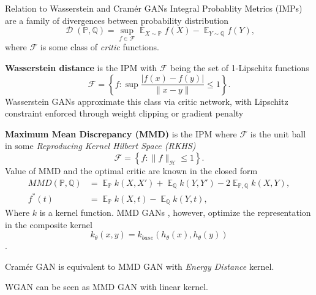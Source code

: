 \documentclass[xcolor={table}]{beamer}
\DeclareMathOperator{\D}{\mathcal{D}}
\DeclareMathOperator*{\E}{\mathbb{E}}
\newcommand{\F}{\mathcal{F}}
\newcommand{\h}{\mathcal{H}}
\newcommand{\PP}{\mathbb P}
\newcommand{\QQ}{\mathbb Q}
\begin{document}
\begin{frame}{}
\begin{columns}[T, totalwidth=\textwidth]
\begin{column}{.32\textwidth}
    \begin{block}{Relation to Wasserstein and Cram\'er GANs} 
      Integral Probablity Metrics (IMPs) are a family of divergences between 
      probability distribution
      \begin{equation}
        \D(\PP, \QQ) = \sup_{f\in\F} \E_{X\sim\PP}f(X) - \E_{Y\sim\QQ}f(Y),
      \end{equation}
      where $\F$ is some class of \emph{critic} functions. 
      \begin{itemize}
        \item{\textbf{Wasserstein distance} is the IPM with $\F$ being the set of 1-Lipschitz functions
          \[  
            \F = \left\{f: \sup\frac{|f(x) - f(y)|}{\|x - y\|}\leq 1\right\}. 
          \]
          Wasserstein GANs approximate this class via critic network, with Lipschitz 
          constraint enforced through weight clipping \citep{wgan} or gradient 
          penalty \citep{wgan-gp}
        \item \textbf{Maximum Mean Discrepancy (MMD)} \citep{mmd-jmlr} is the IPM 
          where $\F$ is the unit ball in some 
          \emph{Reproducing Kernel Hilbert Space (RKHS)}
          \[ \F = \left\{f: \|f\|_{\h} \leq 1\right\}. \]
          Value of MMD and the optimal critic are known in the closed form
          \begin{align*}
            MMD(\PP, \QQ) &= \E_{\PP} k(X,X') + \E_{\QQ} k(Y,Y') - 2\E_{\PP,\QQ} k(X,Y),\\
            f^*(t) &= \E_{\PP}k(X, t) - \E_{\QQ}k(Y, t),
          \end{align*}
          Where $k$ is a kernel function. MMD GANs \citep{mmd-gan}, however, 
          optimize the representation in the composite kernel 
          \[ k_{\theta}(x, y) = k_{base}(h_{\theta}(x), h_{\theta}(y)) \].
        }
        \item Cram\'er GAN is equivalent to MMD GAN with \emph{Energy Distance} kernel.
        \item WGAN can be seen as  MMD GAN with linear kernel.
      \end{itemize}
    \end{block}
  \end{column}


\end{columns}
\end{frame}
\end{document}
